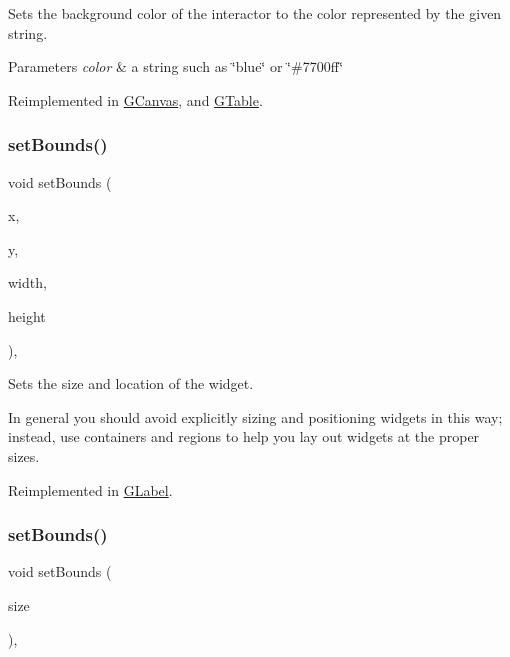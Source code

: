 Sets the background color of the interactor to the color represented by the given string. 


\begin{DoxyParams}{Parameters}
{\em color} & a string such as \char`\"{}blue\char`\"{} or \char`\"{}\#7700ff\char`\"{} \\
\hline
\end{DoxyParams}


Reimplemented in \mbox{\hyperlink{classGCanvas_a9cb99695b93494c7ba28268ce9e42c2a}{G\+Canvas}}, and \mbox{\hyperlink{classGTable_a9cb99695b93494c7ba28268ce9e42c2a}{G\+Table}}.

\mbox{\label{classGInteractor_a2aae8197624b72265ab83b4f1bc73f2f}} 
\subsubsection{\texorpdfstring{set\+Bounds()}{setBounds()}\hspace{0.1cm}{\footnotesize\ttfamily [1/2]}}
{\footnotesize\ttfamily void set\+Bounds (\begin{DoxyParamCaption}\item[{double}]{x,  }\item[{double}]{y,  }\item[{double}]{width,  }\item[{double}]{height }\end{DoxyParamCaption})\hspace{0.3cm}{\ttfamily [virtual]}, {\ttfamily [inherited]}}



Sets the size and location of the widget. 

In general you should avoid explicitly sizing and positioning widgets in this way; instead, use containers and regions to help you lay out widgets at the proper sizes. 

Reimplemented in \mbox{\hyperlink{classGLabel_ab9f89f193ad29d66c547cfee29ffde39}{G\+Label}}.

\mbox{\label{classGInteractor_acada386653f008cacc7cce86426bef7c}} 
\subsubsection{\texorpdfstring{set\+Bounds()}{setBounds()}\hspace{0.1cm}{\footnotesize\ttfamily [2/2]}}
{\footnotesize\ttfamily void set\+Bounds (\begin{DoxyParamCaption}\item[{const \mbox{\hyperlink{structGRectangle}{G\+Rectangle}} \&}]{size }\end{DoxyParamCaption})\hspace{0.3cm}{\ttfamily [virtual]}, {\ttfamily [inherited]}}



